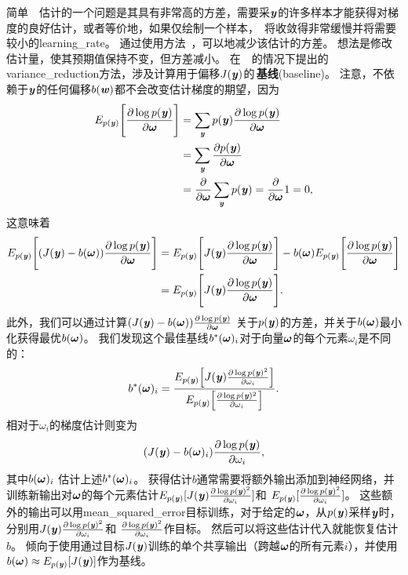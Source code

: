 简单~~估计的一个问题是其具有非常高的方差，需要采$\Vy$的许多样本才能获得对梯度的良好估计，或者等价地，如果仅绘制一个样本，~将收敛得非常缓慢并将需要较小的\gls{learning_rate}。
通过使用方法~\citep{Wilson-1984,LEcuyer-1994}，可以地减少该估计的方差。
想法是修改估计量，使其预期值保持不变，但方差减小。
在~~的情况下提出的\gls{variance_reduction}方法，涉及计算用于偏移$J(\Vy)$的\,\textbf{基线}(baseline)。
注意，不依赖于$\Vy$的任何偏移$b(\Vw)$都不会改变估计梯度的期望，因为
\begin{align}
 E_{p(\Vy)} \Bigg[ \frac{\partial\log p(\Vy)}{\partial \Vomega}  \Bigg] &=
 \sum_{\Vy} p(\Vy) \frac{\partial\log p(\Vy)}{\partial \Vomega} \\
 &= \sum_{\Vy} \frac{\partial p(\Vy)}{\partial \Vomega} \\
 &= \frac{\partial}{\partial \Vomega} \sum_{\Vy} p(\Vy) = 
 \frac{\partial}{\partial \Vomega} 1 = 0,
\end{align}
这意味着
\begin{align}
 E_{p(\Vy)} \Bigg[ (J(\Vy) - b(\Vomega))\frac{\partial\log p(\Vy)}{\partial \Vomega}  \Bigg] &= 
 E_{p(\Vy)} \Bigg[ J(\Vy) \frac{\partial\log p(\Vy)}{\partial \Vomega} \Bigg]
 - b(\Vomega) E_{p(\Vy)} \Bigg[ \frac{\partial\log p(\Vy)}{\partial \Vomega}  \Bigg] \\
 &= E_{p(\Vy)} \Bigg[ J(\Vy) \frac{\partial\log p(\Vy)}{\partial \Vomega} \Bigg] .
\end{align}
此外，我们可以通过计算$(J(\Vy) - b(\Vomega))\frac{\partial\log p(\Vy)}{\partial \Vomega} $
关于$p(\Vy)$的方差，并关于$b(\Vomega)$最小化获得最优$b(\Vomega)$。
我们发现这个最佳基线$b^*(\Vomega)_i$对于向量$\Vomega$的每个元素$\omega_i$是不同的：
\begin{align} \label{eq:est_b}
 b^*(\Vomega)_i = \frac{E_{p(\Vy)} \Big[ J(\Vy)
 \frac{\partial\log p(\Vy)^2}{\partial \omega_i}  \Big]}
{E_{p(\Vy)} \Big[\frac{\partial\log p(\Vy)^2}{\partial \omega_i}\Big] }.
\end{align}
相对于$\omega_i$的梯度估计则变为
\begin{align}
 (J(\Vy) - b(\Vomega)_i)\frac{\partial\log p(\Vy)}{\partial \omega_i},
\end{align}
其中$ b(\Vomega)_i$ 估计上述$ b^*(\Vomega)_i$。
获得估计$b$通常需要将额外输出添加到神经网络，并训练新输出对$\Vomega$的每个元素估计$E_{p(\Vy)} 
[J(\Vy)\frac{\partial\log p(\Vy)^2}{\partial \omega_i}]$和
$E_{p(\Vy)}[\frac{\partial\log p(\Vy)^2}{\partial \omega_i}]$。
这些额外的输出可以用\gls{mean_squared_error}目标训练，对于给定的$\Vomega$，从$p(\Vy)$采样$\Vy$时，分别用$J(\Vy)\frac{\partial\log p(\Vy)^2}{\partial \omega_i}$和 $\frac{\partial\log p(\Vy)^2}{\partial \omega_i}$作目标。
然后可以将这些估计代入就能恢复估计$b$。
\citet{Mnih+Gregor-ICML2014} 倾向于使用通过目标$J(\Vy)$训练的单个共享输出（跨越$\Vomega$的所有元素$i$），并使用$b(\Vomega) \approx E_{p(\Vy)} [J(\Vy)]$作为基线。

